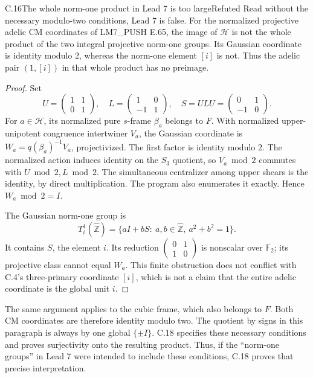 \begin{statement}{C.16}{The whole norm-one product in Lead 7 is too large}{Refuted}
Read without the necessary modulo-two conditions,
Lead 7 is false. For the normalized projective adelic CM
coordinates of LM7\_PUSH E.65, the image
of \(\mathcal H\) is not the whole product
of the two integral projective norm-one groups.
Its Gaussian coordinate is identity modulo
2, whereas the norm-one element \([i]\)
is not. Thus the adelic pair \((1,[i])\)
in that whole product has no preimage.
\end{statement}
\begin{proof}
Set
\[
 U=\begin{pmatrix}1&1\\0&1\end{pmatrix},\quad
 L=\begin{pmatrix}1&0\\-1&1\end{pmatrix},\quad
 S=ULU=\begin{pmatrix}0&1\\-1&0\end{pmatrix}.
 \tag{C.16a}
\]
For \(a\in\mathcal H\), its normalized
pure \(s\)-frame \(\beta_a\) belongs to \(F\).
With normalized upper-unipotent congruence
intertwiner \(V_a\), the Gaussian coordinate
is \(W_a=q(\beta_a)^{-1}V_a\), projectivized.
The first factor is identity modulo 2.
The normalized action induces identity on
the \(S_3\) quotient, so \(V_a\bmod2\)
commutes with \(U\bmod2,L\bmod2\).
The simultaneous centralizer among upper
shears is the identity, by direct
multiplication. The program
 also
enumerates it exactly. Hence \(W_a\bmod2=I\).

The Gaussian norm-one group is
\[
 T_i^1(\widehat{\mathbb Z})
 =\{aI+bS:\ a,b\in\widehat{\mathbb Z},\
                         a^2+b^2=1\}.
 \tag{C.16b}
\]
It contains \(S\), the element \(i\).
Its reduction
\(\left(\begin{smallmatrix}0&1\\1&0\end{smallmatrix}\right)\)
is nonscalar over \(\mathbb F_2\); its
projective class cannot equal \(W_a\).
This finite obstruction does not conflict
with C.4's three-primary coordinate \([i]\),
which is not a claim that the entire
adelic coordinate is the global unit \(i\).
\end{proof}

The same argument applies to the cubic frame, which
also belongs to \(F\). Both CM coordinates are therefore
identity modulo two. The quotient by signs in this
paragraph is always by one global \(\{\pm I\}\).
C.18 specifies these necessary conditions and proves
surjectivity onto the resulting product. Thus, if the
``norm-one groups'' in Lead 7 were intended to include
these conditions, C.18 proves that precise interpretation.

